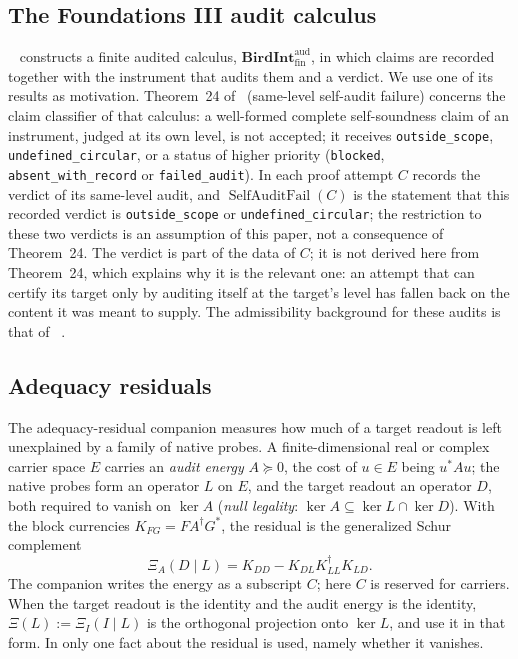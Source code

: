 \subsection{The Foundations III audit calculus}\label{sec:apparatus:birdint}

\FThree\ \cite{Tsiokos2026FoundationsIII} constructs a finite audited
calculus, \(\mathbf{BirdInt}^{\mathrm{aud}}_{\mathrm{fin}}\), in which
claims are recorded together with the instrument that audits them and a
verdict.  We use one of its results as motivation.  Theorem~24 of
\FThree\ (same-level self-audit failure) concerns the claim classifier
of that calculus: a well-formed complete self-soundness claim of an
instrument, judged at its own level, is not accepted; it receives
\texttt{outside\_scope}, \texttt{undefined\_circular}, or a status of
higher priority (\texttt{blocked}, \texttt{absent\_with\_record} or
\texttt{failed\_audit}).  In  each proof attempt
\(C\) records the verdict of its same-level audit, and
\(\operatorname{SelfAuditFail}(C)\) is the statement that this recorded
verdict is \texttt{outside\_scope} or \texttt{undefined\_circular}; the
restriction to these two verdicts is an assumption of this paper, not a
consequence of Theorem~24.  The verdict
is part of the data of \(C\); it is not derived here from Theorem~24,
which explains why it is the relevant one: an attempt that can certify
its target only by auditing itself at the target's level has fallen
back on the content it was meant to supply.  The admissibility
background for these audits is that of \FTwo\
\cite{Tsiokos2026FoundationsII}.

\subsection{Adequacy residuals}\label{sec:apparatus:adequacy-residual}

The adequacy-residual companion \cite{Tsiokos2026XiCompanion} measures
how much of a target readout is left unexplained by a family of native
probes.  A finite-dimensional real or complex carrier space \(E\)
carries an \emph{audit energy} \(A\succeq0\), the cost of \(u\in E\)
being \(u^{*}Au\); the native probes form an operator \(L\) on \(E\), and
the target readout an operator \(D\), both required to vanish on
\(\ker A\) (\emph{null legality}: \(\ker A\subseteq\ker L\cap\ker D\)).  With the block currencies \(K_{FG}=FA^{\dagger}G^{*}\),
the residual is the generalized Schur complement
\[
  \Xi_{A}(D\mid L)=K_{DD}-K_{DL}K_{LL}^{\dagger}K_{LD}.
\]
The companion writes the energy as a subscript \(C\); here \(C\) is
reserved for carriers.  When the target readout is the identity and the
audit energy is the identity, \(\Xi(L):=\Xi_{I}(I\mid L)\) is the
orthogonal projection onto \(\ker L\), and
 use it in that form.  In
\Cref{sec:foreclosure} only one fact about the residual is used, namely
whether it vanishes.


